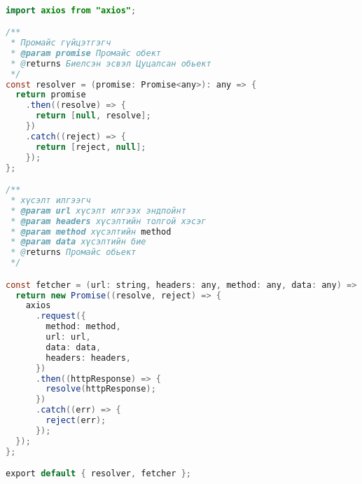 \\ 
\begin{lstlisting}[language=java, caption=API дуудах үндсэн глобар функц, frame=single]
import axios from "axios";

/**
 * Промайс гүйцэтгэгч
 * @param promise Промайс обект
 * @returns Биелсэн эсвэл Цуцалсан обьект
 */
const resolver = (promise: Promise<any>): any => {
  return promise
    .then((resolve) => {
      return [null, resolve];
    })
    .catch((reject) => {
      return [reject, null];
    });
};

/**
 * хүсэлт илгээгч
 * @param url хүсэлт илгээх эндпойнт
 * @param headers хүсэлтийн толгой хэсэг
 * @param method хүсэлтийн method
 * @param data хүсэлтийн бие
 * @returns Промайс обьект
 */

const fetcher = (url: string, headers: any, method: any, data: any) => {
  return new Promise((resolve, reject) => {
    axios
      .request({
        method: method,
        url: url,
        data: data,
        headers: headers,
      })
      .then((httpResponse) => {
        resolve(httpResponse);
      })
      .catch((err) => {
        reject(err);
      });
  });
};

export default { resolver, fetcher };

\end{lstlisting}

